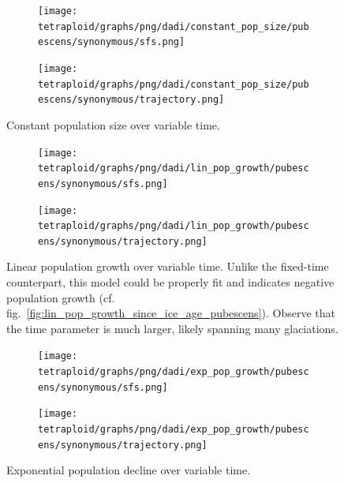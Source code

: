 \documentclass[hidelinks,11pt]{article}
\begin{document}
    \begin{figure}[H]
        \centering
        \begin{subfigure}[b]{0.465\textwidth}
            \texttt{[image: tetraploid/graphs/png/dadi/constant\_pop\_size/pubescens/synonymous/sfs.png]}
        \end{subfigure}
        \hfill
        \begin{subfigure}[b]{0.525\textwidth}
            \texttt{[image: tetraploid/graphs/png/dadi/constant\_pop\_size/pubescens/synonymous/trajectory.png]}
        \end{subfigure}
        \caption{Constant population size over variable time.}
        \label{fig:constant_pop_size_pubescens}
    \end{figure}

    \begin{figure}[H]
        \centering
        \begin{subfigure}[b]{0.465\textwidth}
            \texttt{[image: tetraploid/graphs/png/dadi/lin\_pop\_growth/pubescens/synonymous/sfs.png]}
        \end{subfigure}
        \hfill
        \begin{subfigure}[b]{0.525\textwidth}
            \texttt{[image: tetraploid/graphs/png/dadi/lin\_pop\_growth/pubescens/synonymous/trajectory.png]}
        \end{subfigure}
        \caption{Linear population growth over variable time. Unlike the fixed-time counterpart, this model could be properly fit and indicates negative population growth (cf. fig.~\ref{fig:lin_pop_growth_since_ice_age_pubescens}). Observe that the time parameter is much larger, likely spanning many glaciations.}
        \label{fig:lin_pop_growth_pubescens}
    \end{figure}

    \begin{figure}[H]
        \centering
        \begin{subfigure}[b]{0.465\textwidth}
            \texttt{[image: tetraploid/graphs/png/dadi/exp\_pop\_growth/pubescens/synonymous/sfs.png]}
        \end{subfigure}
        \hfill
        \begin{subfigure}[b]{0.525\textwidth}
            \texttt{[image: tetraploid/graphs/png/dadi/exp\_pop\_growth/pubescens/synonymous/trajectory.png]}
        \end{subfigure}
        \caption{Exponential population decline over variable time.}
        \label{fig:exp_pop_growth_pubescens}
    \end{figure}
\end{document}
